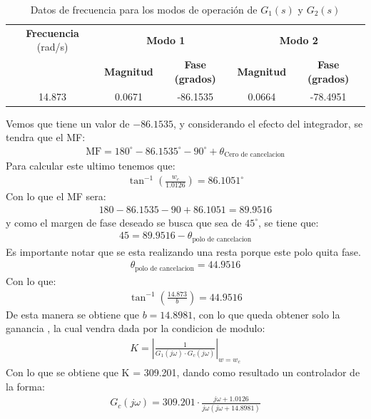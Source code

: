 \documentclass[
  11pt,
  letterpaper,
   addpoints,
   answers
  ]{exam}
\begin{document}
\begin{questions}
\begin{solution}
\begin{table}[H]
\begin{tabular}{|c|c|c|c|c|}
    \hline
    \textbf{Frecuencia} (rad/s) & \multicolumn{2}{c|}{\textbf{Modo 1}} & \multicolumn{2}{c|}{\textbf{Modo 2}} \\
    \cline{2-5}
    & \textbf{Magnitud} & \textbf{Fase (grados)} & \textbf{Magnitud} & \textbf{Fase (grados)} \\
    \hline
    14.873 & 0.0671 & -86.1535 & 0.0664 & -78.4951 \\
    \hline
    \end{tabular}
    \caption{Datos de frecuencia para los modos de operación de $G_1(s)$ y $G_2(s)$}
\end{table}
Vemos que tiene un valor de $-86.1535$, y considerando el efecto del integrador, se tendra que el MF:
\begin{align}
    \text{MF} = 180^{\circ} - 86.1535^{\circ}  - 90^{\circ} + \theta_{\text{Cero de cancelacion}}  
\end{align}
Para calcular este ultimo tenemos que:
\begin{align}
    \tan^{-1}\left(\frac{w_{c}}{1.0126}\right) = 86.1051^{\circ}
\end{align}
Con lo que el MF sera:
\begin{align}
    180 - 86.1535 - 90 + 86.1051 = 89.9516
\end{align}
y como el margen de fase deseado se busca que sea de $45^{\circ}$, se tiene que:
\begin{align}
    45 = 89.9516 - \theta_{\text{polo de cancelacion}}
\end{align}
Es importante notar que se esta realizando una resta porque este polo quita fase.
\begin{align}
    \theta_{\text{polo de cancelacion}} = 44.9516
\end{align}
Con lo que:
\begin{align}
    \tan^{-1}\left(\frac{14.873}{b}\right) = 44.9516
\end{align}
De esta manera se obtiene que $b=14.8981$, con lo que queda obtener solo la ganancia , la cual vendra dada por la condicion de modulo:
\begin{align}
    K = \left| \frac{1}{ G_{1}(j\omega) \cdot G_{c}(j\omega) }\right|_{w=w_{c}}
\end{align}
Con lo que se obtiene que K = 309.201, dando como resultado un controlador de la forma:
\begin{align}
    G_{c}(j\omega) = 309.201 \cdot \frac{j\omega + 1.0126}{j\omega (j\omega + 14.8981)}
\end{align}

\end{solution}
\end{questions}
\end{document}
